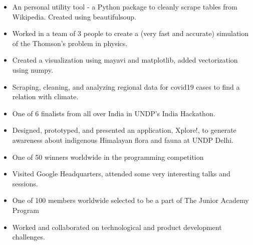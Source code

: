 \documentclass[a4paper]{resume}
\begin{document}
\begin{itemize} \vspace{-5pt} \itemsep -2pt
	\item An personal utility tool - a Python package to cleanly scrape tables from Wikipedia. Created using beautifulsoup.
\end{itemize}
\enresubsection
{}
\begin{itemize} \vspace{-5pt} \itemsep -2pt
	\item Worked in a team of 3 people to create a (very fast and accurate) simulation of the Thomson's problem in physics.
	\item Created a visualization using mayavi and matplotlib, added vectorization using numpy.
\end{itemize}
\enresubsection
{}
\begin{itemize} \vspace{-5pt} \itemsep -2pt
	\item Scraping, cleaning, and analyzing regional data for covid19 cases to find a relation with climate.
\end{itemize}
\enresection

\begin{itemize} \vspace{-5pt} \itemsep -2pt
	\item One of 6 finalists from all over India in UNDP's India Hackathon.
	\item Designed, prototyped, and presented an application, Xplore!, to generate awareness about indigenous Himalayan flora and fauna at UNDP Delhi.
\end{itemize}
\enresubsection
{}
\begin{itemize} \vspace{-5pt} \itemsep -2pt
	\item One of 50 winners worldwide in the programming competition
	\item Visited Google Headquarters, attended some very interesting talks and sessions.
\end{itemize}
\enresubsection
{}
\begin{itemize} \vspace{-5pt} \itemsep -2pt
	\item One of 100 members worldwide selected to be a part of The Junior Academy Program
	\item Worked and collaborated on technological and product development challenges.
\end{itemize}
\enresection
\end{document}

